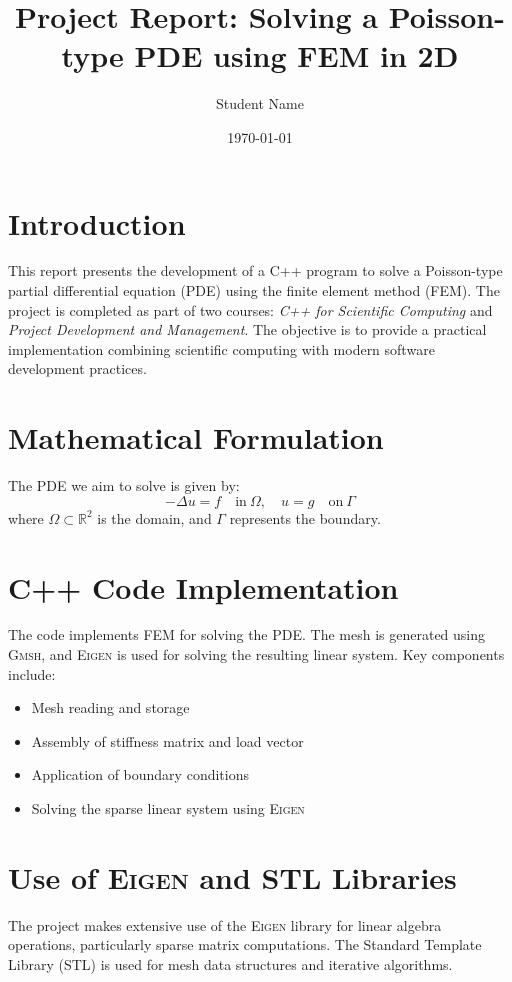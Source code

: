 \documentclass[english,10pt,a4paper]{article}
\title{Project Report: Solving a Poisson-type PDE using FEM in 2D}
\author{Student Name}
\date{\today}
\begin{document}
\maketitle

\tableofcontents

\section{Introduction}
\label{sec:introduction}
This report presents the development of a C++ program to solve a Poisson-type partial differential equation (PDE) using the finite element method (FEM). The project is completed as part of two courses: \textit{C++ for Scientific Computing} and \textit{Project Development and Management}. The objective is to provide a practical implementation combining scientific computing with modern software development practices.

\section{Mathematical Formulation}
\label{sec:mathematical_formulation}
The PDE we aim to solve is given by:
\[
-\Delta u = f \quad \text{in} \ \Omega, \quad u = g \quad \text{on} \ \Gamma
\]
where $\Omega \subset \mathbb{R}^2$ is the domain, and $\Gamma$ represents the boundary.

\section{C++ Code Implementation}
\label{sec:cpp_implementation}
The code implements FEM for solving the PDE. The mesh is generated using \textsc{Gmsh}, and \textsc{Eigen} is used for solving the resulting linear system. Key components include:
\begin{itemize}
    \item Mesh reading and storage
    \item Assembly of stiffness matrix and load vector
    \item Application of boundary conditions
    \item Solving the sparse linear system using \textsc{Eigen}
\end{itemize}

\section{Use of \textsc{Eigen} and STL Libraries}
\label{sec:eigen_stl}
The project makes extensive use of the \textsc{Eigen} library for linear algebra operations, particularly sparse matrix computations. The Standard Template Library (STL) is used for mesh data structures and iterative algorithms.
\end{document}
